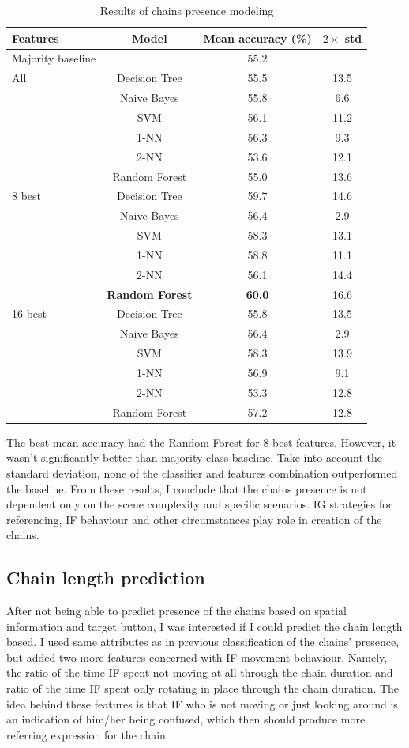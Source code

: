 \begin{table}[!htbp]
 \centering
\begin{tabular}{lccc}
\toprule
Features & Model    & Mean accuracy (\%) & $2\times$ std \\
\midrule
Majority baseline &    & 55.2	& \\
\midrule
All & Decision Tree 	& 55.5		& 13.5 	\\
	& Naive Bayes  	& 55.8		& 6.6 	\\
	& SVM 			& 56.1		& 11.2 	\\
	& 1-NN			& 56.3		& 9.3 	\\
	& 2-NN			& 53.6		& 12.1 	\\
	& Random Forest	& 55.0		& 13.6	\\
\midrule
8 best 	& Decision Tree 	& 	59.7		& 14.6  	\\
		& Naive Bayes  	&	56.4		& 2.9 	\\
		& SVM 			&	58.3		& 13.1 	\\
		& 1-NN			&	58.8		& 11.1 	\\
		& 2-NN			&	56.1		& 14.4 	\\
		& \textbf{Random Forest}	&	\textbf{60.0	}	& 16.6 	\\
\midrule
16 best & Decision Tree 	& 55.8	& 13.5  	\\
	& Naive Bayes  		& 56.4	& 2.9 	\\
	& SVM 				& 58.3	& 13.9  	\\
	& 1-NN				& 56.9	& 9.1  	\\
	& 2-NN				& 53.3	& 12.8  	\\
	& Random Forest		& 57.2	& 12.8  	\\	
\bottomrule
\end{tabular}
\caption{Results of chains presence modeling}
\label{tab:chains-ml-presence}
\end{table}

The best mean accuracy had the Random Forest for 8 best features. However, it wasn't significantly better than majority class baseline. Take into account the standard deviation, none of the classifier and features combination outperformed the baseline.  From these results, I conclude that the chains presence is not dependent only on the scene complexity and specific scenarios. IG strategies for referencing, IF behaviour and other circumstances play role in creation of the chains.

\subsection{Chain length prediction}
After not being able to predict presence of the chains based on spatial information and target button, I was interested if I could predict the chain length based. I used same attributes as in previous classification of the chains' presence, but added two more features concerned with IF movement behaviour. Namely, the ratio of the time IF spent not moving at all through the chain duration and ratio of the time IF spent only rotating in place through the chain duration. The idea behind these features is that IF who is not moving or just looking around is an indication of him/her being confused, which then should produce more referring expression for the chain.

